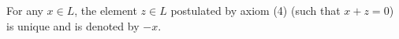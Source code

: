 For any $x \in L$, the element $z \in L$ postulated by axiom (4) (such that $x + z = 0$) is unique and is denoted by $-x$.
